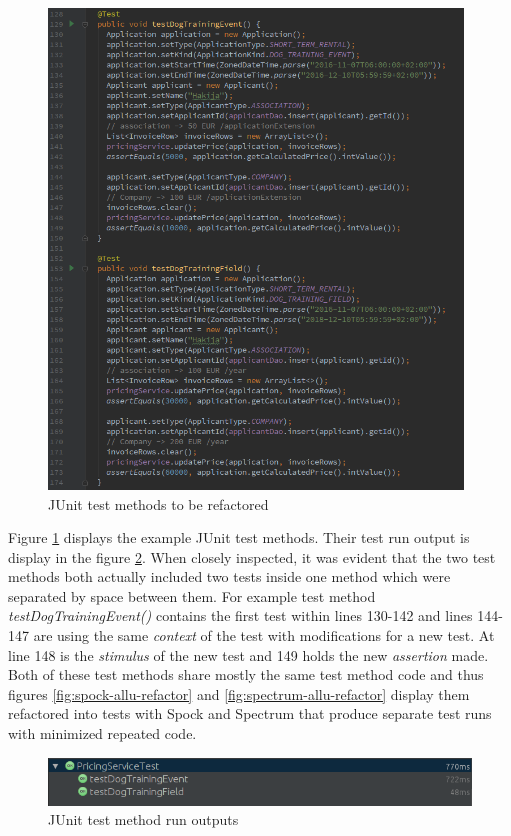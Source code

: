     \begin{figure}[H]
      \begin{center}
        \includegraphics[width=11.0cm]{images/junit-pricing-examples.png}
        \caption{JUnit test methods to be refactored}
        \label{fig:junit-allu-refactor}
      \end{center}
    \end{figure}

    Figure \ref{fig:junit-allu-refactor} displays the example JUnit test methods. Their test run output is display in the
    figure \ref{fig:junit-allu-refactor-output}. When closely inspected, it was evident
    that the two test methods both actually included two tests inside one method which were separated by space between
    them. For example test method \textit{testDogTrainingEvent()} contains the first test within lines 130-142 and lines 144-147 are using
    the same \textit{context} of the test with modifications for a new test. At line 148 is the \textit{stimulus} of the new test and 149 holds
    the new \textit{assertion} made. Both of these test methods share mostly the same test method code and thus figures \ref{fig:spock-allu-refactor} and
    \ref{fig:spectrum-allu-refactor} display them refactored
    into tests with Spock and Spectrum that produce separate test runs with minimized repeated code.

    \begin{figure}[H]
      \begin{center}
        \includegraphics[width=14.7cm]{images/junit-pricing-results.png}
        \caption{JUnit test method run outputs}
        \label{fig:junit-allu-refactor-output}
      \end{center}
    \end{figure}

